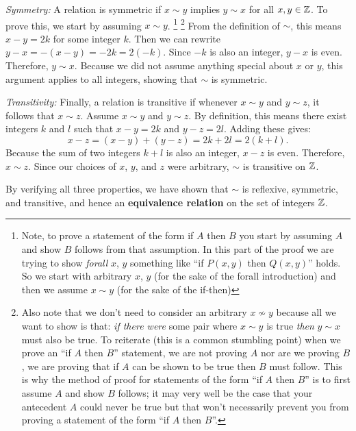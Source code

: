 \newpage
\textit{Symmetry:}
A relation is symmetric if $x \sim y$ implies $y \sim x$ for all $x, y \in {\mathbb{Z}}$. To prove
this, we start by assuming $x \sim y$. \footnote{Note, to prove a statement of the form
if $A$ then $B$ you start by assuming $A$ and show $B$ follows from that assumption. In
this part of the proof we are trying to show \textit{forall} $x$, $y$ something like
``if $P(x,y)$ then $Q(x,y)$'' holds. So we start with arbitrary $x$, $y$ (for the sake of the
forall introduction) and then we assume $x\sim y$ (for the sake of the if-then) } \footnote{
Also note that we don't need to consider an arbitrary $x\not\sim y$ because all we want to
show is that: \textit{if there were} some pair where $x\sim y$ is true \textit{then}
$y\sim x$ must also be true. To reiterate (this is a common stumbling point) when we
prove an ``if $A$ then $B$'' statement, we are not proving $A$ nor are we proving $B$,
we are proving that if $A$ can be shown to be true then $B$ must follow. This is why the
method of proof for statements of the form ``if $A$ then $B$'' is to first assume $A$
and show $B$ follows; it may very well be the case that your antecedent $A$ could never
be true but that won't necessarily prevent you from proving a statement of the form
``if $A$ then $B$''.}
From the definition of $\sim$, this means
$x - y = 2k$ for some integer $k$. Then we can rewrite $y - x = -(x - y) = -2k = 2(-k)$.
Since $-k$ is also an integer, $y - x$ is even. Therefore, $y \sim x$. Because we did
not assume anything special about $x$ or $y$, this argument applies to all integers,
showing that $\sim$ is symmetric. \steezybreak

\textit{Transitivity:}
Finally, a relation is transitive if whenever $x \sim y$ and $y \sim z$, it follows that
$x \sim z$.
Assume $x \sim y$ and $y \sim z$. By definition, this means there exist integers $k$ and
$l$ such that $x - y = 2k$ and $y - z = 2l$. Adding these gives:
\[
x - z = (x - y) + (y - z) = 2k + 2l = 2(k + l).
\]
Because the sum of two integers $k + l$ is also an integer, $x - z$ is even. Therefore,
$x \sim z$. Since our choices of $x$, $y$, and $z$ were arbitrary, $\sim$ is transitive
on ${\mathbb{Z}}$. \steezybreak

\noindent By verifying all three properties, we have shown that $\sim$ is reflexive, symmetric,
and transitive, and hence an \textbf{equivalence relation} on the set of integers ${\mathbb{Z}}$.



